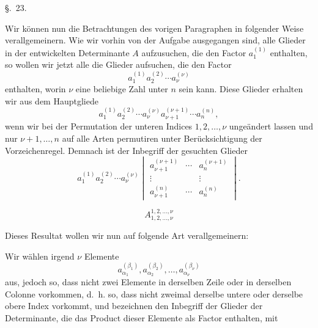 
\begin{center}
{\large \S.\ 23.}

\vspace{0.5em}
{\large{}}
\end{center}

Wir können nun die Betrachtungen des vorigen Paragraphen in folgender Weise verallgemeinern.  Wie wir vorhin von der Aufgabe ausgegangen sind, alle Glieder in der entwickelten Determinante \(A\) aufzusuchen, die den Factor \(a_1^{(1)}\) enthalten, so wollen wir jetzt alle die Glieder aufsuchen, die den Factor
\[
        a_1^{(1)}a_2^{(2)}\cdots a_\nu^{(\nu)}
\]
enthalten, worin \(\nu\) eine beliebige Zahl unter \(n\) sein kann.  Diese Glieder erhalten wir aus dem Hauptgliede
\[
        a_1^{(1)}a_2^{(2)}\cdots a_\nu^{(\nu)}a_{\nu+1}^{(\nu+1)}\cdots a_n^{(n)},
\]
wenn wir bei der Permutation der unteren Indices \(1,2,\ldots,\nu\) ungeändert lassen und nur \(\nu+1,\ldots,n\) auf alle Arten permutiren unter Berücksichtigung der Vorzeichenregel.  Demnach ist der Inbegriff der gesuchten Glieder
\begin{equation}
        a_1^{(1)}a_2^{(2)}\cdots a_\nu^{(\nu)}
        \begin{vmatrix}
        a_{\nu+1}^{(\nu+1)}&\cdots&a_n^{(\nu+1)}\\
        \vdots&&\vdots\\
        a_{\nu+1}^{(n)}&\cdots&a_n^{(n)}
        \end{vmatrix}.
\tag{1}
\end{equation}

\[
        A_{1,2,\ldots,\nu}^{1,2,\ldots,\nu}
\]

Dieses Resultat wollen wir nun auf folgende Art verallgemeinern:

Wir wählen irgend \(\nu\) Elemente
\[
        a_{\alpha_1}^{(\beta_1)},
        a_{\alpha_2}^{(\beta_2)},\ldots,
        a_{\alpha_\nu}^{(\beta_\nu)}
\]
aus, jedoch so, dass nicht zwei Elemente in derselben Zeile oder in derselben Colonne vorkommen, d.~h. so, dass nicht zweimal derselbe untere oder derselbe obere Index vorkommt, und bezeichnen den Inbegriff der Glieder der Determinante, die das Product dieser Elemente als Factor enthalten, mit
